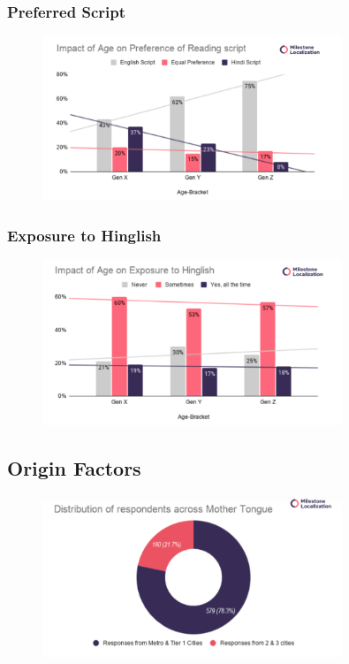 \documentclass{article}
\begin{document}
\subsubsection{Preferred Script}

\begin{figure}[H]
    \centering
    \includegraphics[width=0.8\textwidth]{plots/age_preferred_script.png}
\end{figure}

\subsubsection{Exposure to Hinglish}

\begin{figure}[H]
    \centering
    \includegraphics[width=0.8\textwidth]{plots/age_exposure.png}
\end{figure}

\subsection{Origin Factors}

\begin{figure}[H]
    \centering
    \includegraphics[width=0.8\textwidth]{plots/distribution_with_city.png}
\end{figure}
\end{document}

